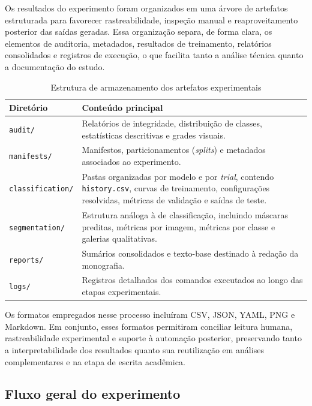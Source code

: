 \documentclass[tcc,capa]{texufpel}
\begin{document}
Os resultados do experimento foram organizados em uma árvore de artefatos estruturada para favorecer rastreabilidade, inspeção manual e reaproveitamento posterior das saídas geradas. Essa organização separa, de forma clara, os elementos de auditoria, metadados, resultados de treinamento, relatórios consolidados e registros de execução, o que facilita tanto a análise técnica quanto a documentação do estudo.

\begin{table}[htbp]
	\centering
	\caption{Estrutura de armazenamento dos artefatos experimentais}
	\label{tab:estrutura_artefatos_resultados}
	\begin{tabular}{|p{3.2cm}|p{10.2cm}|}
		\hline
		\textbf{Diretório} & \textbf{Conteúdo principal} \\ \hline
		\texttt{audit/} & Relatórios de integridade, distribuição de classes, estatísticas descritivas e grades visuais. \\ \hline
		\texttt{manifests/} & Manifestos, particionamentos (\textit{splits}) e metadados associados ao experimento. \\ \hline
		\texttt{classification/} & Pastas organizadas por modelo e por \textit{trial}, contendo \texttt{history.csv}, curvas de treinamento, configurações resolvidas, métricas de validação e saídas de teste. \\ \hline
		\texttt{segmentation/} & Estrutura análoga à de classificação, incluindo máscaras preditas, métricas por imagem, métricas por classe e galerias qualitativas. \\ \hline
		\texttt{reports/} & Sumários consolidados e texto-base destinado à redação da monografia. \\ \hline
		\texttt{logs/} & Registros detalhados dos comandos executados ao longo das etapas experimentais. \\ \hline
	\end{tabular}
\end{table}

Os formatos empregados nesse processo incluíram CSV, JSON, YAML, PNG e Markdown. Em conjunto, esses formatos permitiram conciliar leitura humana, rastreabilidade experimental e suporte à automação posterior, preservando tanto a interpretabilidade dos resultados quanto sua reutilização em análises complementares e na etapa de escrita acadêmica.

\subsection{Fluxo geral do experimento}
\end{document}
